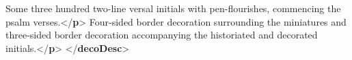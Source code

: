 \begin{shaded}
\mbox{}\newline 
\hspace*{1em}Some three hundred two-line versal initials with pen-flourishes, commencing\mbox{}\newline 
\hspace*{1em}\hspace*{1em}\hspace*{1em}\hspace*{1em} the psalm verses.{</\textbf{p}>}\mbox{}\newline 
{}\mbox{}\newline 
{}\mbox{}\newline 
\hspace*{1em}Four-sided border decoration surrounding the miniatures and three-sided\mbox{}\newline 
\hspace*{1em}\hspace*{1em}\hspace*{1em}\hspace*{1em} border decoration accompanying the historiated and decorated initials.{</\textbf{p}>}\mbox{}\newline 
{}\mbox{}\newline 
{</\textbf{decoDesc}>}\end{shaded}\egroup\par \par
